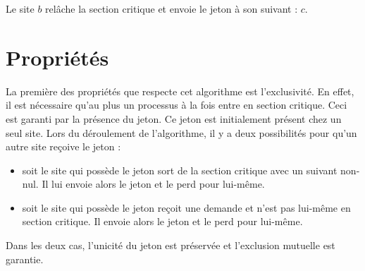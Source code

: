Le site $b$ relâche la section critique et envoie le jeton à son suivant : $c$.
\begin{figure}[H]
\centering
	\caption{\label{naimi-trehel-exemple4}}
\end{figure}


\section{Propriétés}
La première des propriétés que respecte cet algorithme est l'exclusivité. En effet, il est nécessaire qu'au plus un processus à la fois entre en section critique. Ceci est garanti par la présence du jeton. Ce jeton est initialement présent chez un seul site. Lors du déroulement de l'algorithme, il y a deux possibilités pour qu'un autre site reçoive le jeton : 
\begin{itemize}
	\item soit le site qui possède le jeton sort de la section critique avec un suivant non-nul. Il lui envoie alors le jeton et le perd pour lui-même.
	\item soit le site qui possède le jeton reçoit une demande et n'est pas lui-même en section critique. Il envoie alors le jeton et le perd pour lui-même.
\end{itemize}
Dans les deux cas, l'unicité du jeton est préservée et l'exclusion mutuelle est garantie.

